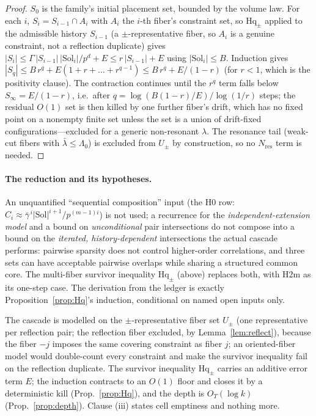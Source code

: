 \documentclass[11pt,a4paper]{article}
\numberwithin{equation}{section}
\theoremstyle{plain}
\theoremstyle{plain}
\theoremstyle{definition}
\theoremstyle{remark}
\begin{document}
\begin{proof}
$S_0$ is the family's initial placement set, bounded by the volume law.
For each $i$, $S_i=S_{i-1}\cap A_i$ with $A_i$ the $i$-th fiber's
constraint set, so $\mathrm{Hq}_\pm$ applied to the admissible history
$S_{i-1}$ (a $\pm$-representative fiber, so $A_i$ is a genuine constraint,
not a reflection duplicate) gives
$|S_i|\le\Gamma\,|S_{i-1}|\,|\mathrm{Sol}_i|/p^{d}+E\le r\,|S_{i-1}|+E$
using $|\mathrm{Sol}_i|\le B$. Induction gives
$|S_q|\le B\,r^{q}+E(1+r+\dots+r^{q-1})\le B\,r^{q}+E/(1-r)$ (for $r<1$,
which is the positivity clause). The contraction continues until the
$r^{q}$ term falls below $S_\infty=E/(1-r)$, i.e.\ after
$q=\log(B(1-r)/E)/\log(1/r)$ steps; the residual $O(1)$ set is then killed
by one further fiber's drift, which has no fixed point on a nonempty finite
set unless the set is a union of drift-fixed configurations---excluded for a
generic non-resonant $\lambda$. The resonance tail (weak-cut fibers with
$\bar\lambda\le\Lambda_0$) is excluded from $U_\pm$ by construction, so no
$N_{\mathrm{res}}$ term is needed.
\end{proof}

\paragraph{The reduction and its hypotheses.}
An unquantified ``sequential composition'' input
(the $\mathrm{H0}$ row: $C_i\approx
\bar\gamma^{\,i}|\mathrm{Sol}|^{i+1}/p^{(m-1)i}$) is not used; a recurrence for the
\emph{independent-extension model} and a bound on \emph{unconditional} pair
intersections do not compose into a bound on the \emph{iterated,
history-dependent} intersections the actual cascade performs: pairwise
sparsity does not control higher-order correlations, and three sets can have
acceptable pairwise overlaps while sharing a structured common core. The
multi-fiber survivor inequality $\mathrm{Hq}_\pm$ (above) replaces both, with
$\mathrm{H2m}$ as its one-step case. The derivation from the ledger is
exactly Proposition~\ref{prop:Hq}'s induction, conditional on named open
inputs only.

The cascade is modelled on the $\pm$-representative fiber set $U_\pm$
(one representative per reflection pair; the reflection fiber excluded, by
Lemma~\ref{lem:reflect}), because the fiber $-j$ imposes the same covering
constraint as fiber $j$; an oriented-fiber model would double-count every
constraint and make the survivor inequality fail on the reflection duplicate.
The survivor inequality $\mathrm{Hq}_\pm$ carries an additive error term $E$;
the induction contracts to an $O(1)$ floor and closes it by a deterministic
kill (Prop.~\ref{prop:Hq}), and the depth is $O_T(\log k)$
(Prop.~\ref{prop:depth}). Clause (iii) states cell emptiness and nothing more.
\end{document}
